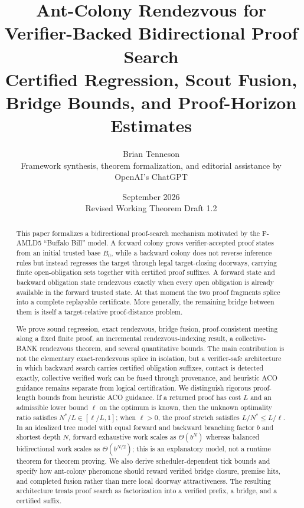 \documentclass[11pt]{article}
\title{\textbf{Ant-Colony Rendezvous for Verifier-Backed Bidirectional Proof Search}\\
\large Certified Regression, Scout Fusion, Bridge Bounds, and Proof-Horizon Estimates}
\author{Brian Tenneson\\
\small Framework synthesis, theorem formalization, and editorial assistance by OpenAI's ChatGPT}
\date{September 2026\\Revised Working Theorem Draft 1.2}
\begin{document}
\maketitle

\begin{abstract}
This paper formalizes a bidirectional proof-search mechanism motivated by the F-AMLD5 ``Buffalo Bill'' model. A forward colony grows verifier-accepted proof states from an initial trusted base $B_0$, while a backward colony does not reverse inference rules but instead regresses the target through legal target-closing doorways, carrying finite open-obligation sets together with certified proof suffixes. A forward state and backward obligation state rendezvous exactly when every open obligation is already available in the forward trusted state. At that moment the two proof fragments splice into a complete replayable certificate. More generally, the remaining bridge between them is itself a target-relative proof-distance problem.

We prove sound regression, exact rendezvous, bridge fusion, proof-consistent meeting along a fixed finite proof, an incremental rendezvous-indexing result, a collective-BANK rendezvous theorem, and several quantitative bounds. The main contribution is not the elementary exact-rendezvous splice in isolation, but a verifier-safe architecture in which backward search carries certified obligation suffixes, contact is detected exactly, collective verified work can be fused through provenance, and heuristic ACO guidance remains separate from logical certification. We distinguish rigorous proof-length bounds from heuristic ACO guidance. If a returned proof has cost $L$ and an admissible lower bound $\ell$ on the optimum is known, then the unknown optimality ratio satisfies $N^*/L\in[\ell/L,1]$; when $\ell>0$, the proof stretch satisfies $L/N^*\le L/\ell$. In an idealized tree model with equal forward and backward branching factor $b$ and shortest depth $N$, forward exhaustive work scales as $\Theta(b^N)$ whereas balanced bidirectional work scales as $\Theta(b^{N/2})$; this is an explanatory model, not a runtime theorem for theorem proving. We also derive scheduler-dependent tick bounds and specify how ant-colony pheromone should reward verified bridge closure, premise hits, and completed fusion rather than mere local doorway attractiveness. The resulting architecture treats proof search as factorization into a verified prefix, a bridge, and a certified suffix.
\end{abstract}
\end{document}
